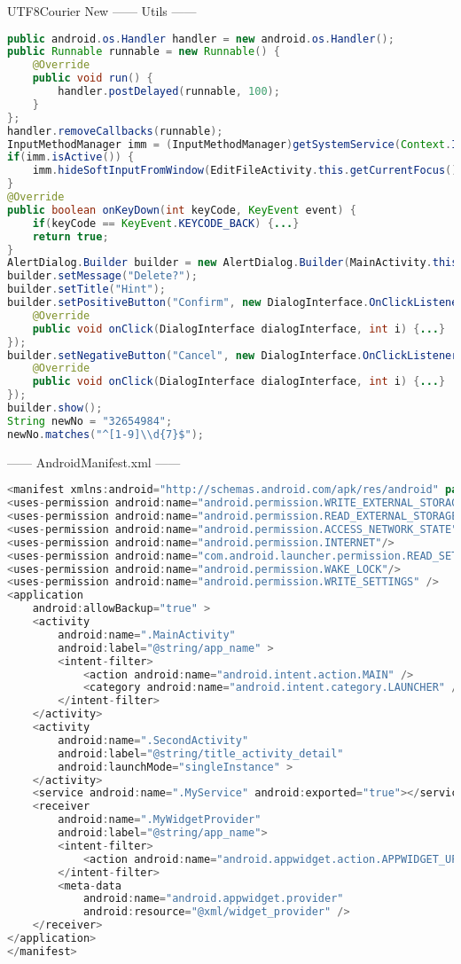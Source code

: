 \documentclass[10pt,a4paper,twocolumn]{report}
\begin{document}
\begin{CJK}{UTF8}{Courier New}
------ Utils ------
\begin{lstlisting}[language=Java]
public android.os.Handler handler = new android.os.Handler();
public Runnable runnable = new Runnable() {
	@Override
	public void run() {
		handler.postDelayed(runnable, 100);
	}
};
handler.removeCallbacks(runnable);
InputMethodManager imm = (InputMethodManager)getSystemService(Context.INPUT_METHOD_SERVICE);
if(imm.isActive()) {
	imm.hideSoftInputFromWindow(EditFileActivity.this.getCurrentFocus().getWindowToken(), InputMethodManager.HIDE_NOT_ALWAYS);
}
@Override
public boolean onKeyDown(int keyCode, KeyEvent event) {
	if(keyCode == KeyEvent.KEYCODE_BACK) {...}
	return true;
}
AlertDialog.Builder builder = new AlertDialog.Builder(MainActivity.this);
builder.setMessage("Delete?");
builder.setTitle("Hint");
builder.setPositiveButton("Confirm", new DialogInterface.OnClickListener() {
	@Override
	public void onClick(DialogInterface dialogInterface, int i) {...}
});
builder.setNegativeButton("Cancel", new DialogInterface.OnClickListener() {
	@Override
	public void onClick(DialogInterface dialogInterface, int i) {...}
});
builder.show();
String newNo = "32654984";
newNo.matches("^[1-9]\\d{7}$");
\end{lstlisting}

------ AndroidManifest.xml ------
\begin{lstlisting}[language=Java]
<manifest xmlns:android="http://schemas.android.com/apk/res/android" package="com.wsine.west.finalexam" >
<uses-permission android:name="android.permission.WRITE_EXTERNAL_STORAGE"/>
<uses-permission android:name="android.permission.READ_EXTERNAL_STORAGE"/>
<uses-permission android:name="android.permission.ACCESS_NETWORK_STATE"/>
<uses-permission android:name="android.permission.INTERNET"/>
<uses-permission android:name="com.android.launcher.permission.READ_SETTINGS" />
<uses-permission android:name="android.permission.WAKE_LOCK"/>
<uses-permission android:name="android.permission.WRITE_SETTINGS" />
<application
	android:allowBackup="true" >
	<activity
		android:name=".MainActivity"
		android:label="@string/app_name" >
		<intent-filter>
			<action android:name="android.intent.action.MAIN" />
			<category android:name="android.intent.category.LAUNCHER" />
		</intent-filter>
	</activity>
	<activity
		android:name=".SecondActivity"
		android:label="@string/title_activity_detail"
		android:launchMode="singleInstance" >
	</activity>
	<service android:name=".MyService" android:exported="true"></service>
	<receiver
		android:name=".MyWidgetProvider"
		android:label="@string/app_name">
		<intent-filter>
			<action android:name="android.appwidget.action.APPWIDGET_UPDATE" />
		</intent-filter>
		<meta-data
			android:name="android.appwidget.provider"
			android:resource="@xml/widget_provider" />
	</receiver>
</application>
</manifest>
\end{lstlisting}



\end{CJK}
\end{document}
